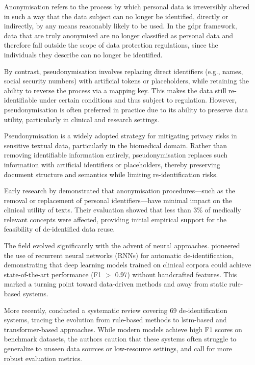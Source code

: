 Anonymisation refers to the process by which personal data is irreversibly altered in such a way that the data subject can no longer be identified, directly or indirectly, by any means reasonably likely to be used. In the \gls{gdpr} framework, data that are truly anonymised are no longer classified as personal data and therefore fall outside the scope of data protection regulations, since the individuals they describe can no longer be identified.

By contrast, pseudonymisation involves replacing direct identifiers (e.g., names, social security numbers) with artificial tokens or placeholders, while retaining the ability to reverse the process via a mapping key. This makes the data still re-identifiable under certain conditions and thus subject to regulation. However, pseudonymisation is often preferred in practice due to its ability to preserve data utility, particularly in clinical and research settings.

Pseudonymisation is a widely adopted strategy for mitigating privacy risks in sensitive textual data, particularly in the biomedical domain. Rather than removing identifiable information entirely, pseudonymisation replaces such information with artificial identifiers or placeholders, thereby preserving document structure and semantics while limiting re-identification risks.

Early research by \citet{meystre2014impact} demonstrated that anonymisation procedures—such as the removal or replacement of personal identifiers—have minimal impact on the clinical utility of texts. Their evaluation showed that less than 3\% of medically relevant concepts were affected, providing initial empirical support for the feasibility of de-identified data reuse.

The field evolved significantly with the advent of neural approaches. \citet{dernoncourt2017rnn} pioneered the use of recurrent neural networks (RNNs) for automatic de-identification, demonstrating that deep learning models trained on clinical corpora could achieve state-of-the-art performance (F1 $>$ 0.97) without handcrafted features. This marked a turning point toward data-driven methods and away from static rule-based systems.

More recently, \citet{kovacevic2024review} conducted a systematic review covering 69 de-identification systems, tracing the evolution from rule-based methods to \gls{lstm}-based and transformer-based approaches. While modern models achieve high F1 scores on benchmark datasets, the authors caution that these systems often struggle to generalize to unseen data sources or low-resource settings, and call for more robust evaluation metrics.

